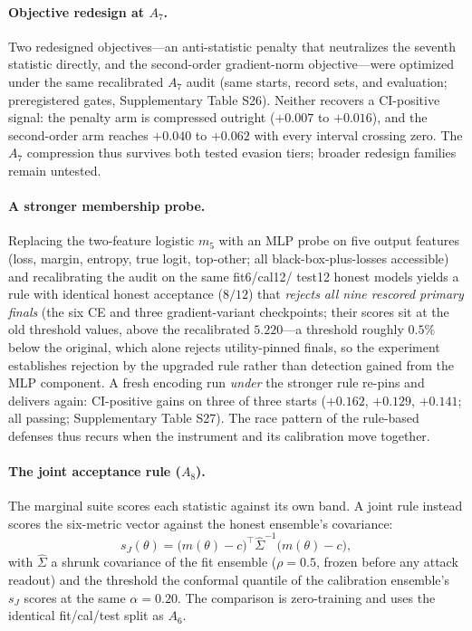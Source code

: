 \documentclass[lettersize,journal]{IEEEtran}
\begin{document}
\paragraph*{Objective redesign at $A_7$.} Two redesigned objectives---an anti-statistic penalty that
neutralizes the seventh statistic directly, and the
second-order gradient-norm objective---were optimized under
the same recalibrated $A_7$ audit (same starts, record sets,
and evaluation; preregistered gates, Supplementary Table S26).
Neither recovers a CI-positive signal: the penalty arm is
compressed outright ($+0.007$ to $+0.016$), and the
second-order arm reaches $+0.040$ to $+0.062$ with every
interval crossing zero. The $A_7$ compression thus survives
both tested evasion tiers; broader redesign families remain
untested.

\paragraph*{A stronger membership probe.} Replacing the two-feature
logistic $m_5$ with an MLP probe on five output features (loss,
margin, entropy, true logit, top-other; all black-box-plus-losses
accessible) and recalibrating the audit on the same fit6/cal12/
test12 honest models yields a rule with identical honest
acceptance ($8/12$) that \emph{rejects all nine rescored primary
finals} (the six CE and three gradient-variant checkpoints;
their scores sit at the old threshold values, above
the recalibrated $5.220$---a threshold roughly $0.5\%$ below
the original, which alone rejects utility-pinned finals, so
the experiment establishes rejection by the upgraded rule
rather than detection gained from the MLP component. A fresh
encoding run
\emph{under} the stronger rule re-pins and delivers again:
CI-positive gains on three of three starts ($+0.162$, $+0.129$,
$+0.141$; all passing; Supplementary Table S27). The race
pattern of the rule-based defenses thus recurs when the
instrument and its calibration move together.

\paragraph*{The joint acceptance rule ($A_8$).}
\label{sec:a8}
The marginal suite scores each statistic against its own band.
A joint rule instead scores the six-metric vector against the
honest ensemble's covariance:
\begin{equation}
\label{eq:a8}
s_J(\theta) = \bigl(m(\theta)-c\bigr)^{\top}
\hat\Sigma^{-1}\bigl(m(\theta)-c\bigr),
\end{equation}
with $\hat\Sigma$ a shrunk
covariance of the fit ensemble ($\rho{=}0.5$, frozen before any
attack readout) and the threshold the conformal quantile of the
calibration ensemble's $s_J$ scores at the same $\alpha{=}0.20$.
The comparison is zero-training and uses the identical
fit/cal/test split as $A_6$.
\end{document}
